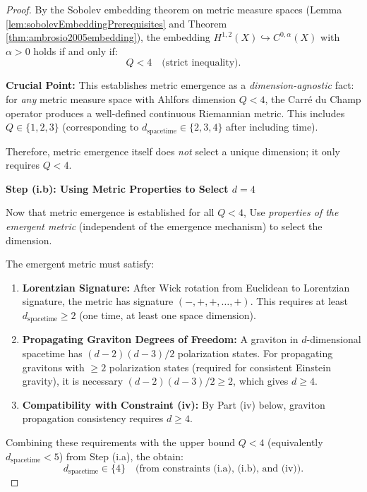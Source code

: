 \begin{lemma}
\begin{proof}
By the Sobolev embedding theorem on metric measure spaces (Lemma \ref{lem:sobolevEmbeddingPrerequisites} and Theorem \ref{thm:ambrosio2005embedding}), the embedding $H^{1,2}(X) \hookrightarrow C^{0,\alpha}(X)$ with $\alpha > 0$ holds if and only if:
\begin{equation}
Q < 4 \quad \text{(strict inequality)}.
\end{equation}

\textbf{Crucial Point:} This establishes metric emergence as a \emph{dimension-agnostic} fact: for \emph{any} metric measure space with Ahlfors dimension $Q < 4$, the Carré du Champ operator produces a well-defined continuous Riemannian metric. This includes $Q \in \{1, 2, 3\}$ (corresponding to $d_{\text{spacetime}} \in \{2, 3, 4\}$ after including time).

Therefore, metric emergence itself does \emph{not} select a unique dimension; it only requires $Q < 4$.

\textbf{Step (i.b): Using Metric Properties to Select $d = 4$}

Now that metric emergence is established for all $Q < 4$, Use \emph{properties of the emergent metric} (independent of the emergence mechanism) to select the dimension.

The emergent metric must satisfy:
\begin{enumerate}
\item \textbf{Lorentzian Signature:} After Wick rotation from Euclidean to Lorentzian signature, the metric has signature $(-,+,+,\ldots,+)$. This requires at least $d_{\text{spacetime}} \geq 2$ (one time, at least one space dimension).

\item \textbf{Propagating Graviton Degrees of Freedom:} A graviton in $d$-dimensional spacetime has $(d-2)(d-3)/2$ polarization states. For propagating gravitons with $\geq 2$ polarization states (required for consistent Einstein gravity), it is necessary $(d-2)(d-3)/2 \geq 2$, which gives $d \geq 4$.

\item \textbf{Compatibility with Constraint (iv):} By Part (iv) below, graviton propagation consistency requires $d \geq 4$.
\end{enumerate}

Combining these requirements with the upper bound $Q < 4$ (equivalently $d_{\text{spacetime}} < 5$) from Step (i.a), the obtain:
\begin{equation}
d_{\text{spacetime}} \in \{4\} \quad \text{(from constraints (i.a), (i.b), and (iv))}.
\end{equation}


\end{proof}
\end{lemma}
